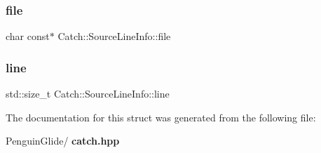 \subsubsection{file}
{\footnotesize\ttfamily char const$\ast$ Catch\+::\+Source\+Line\+Info\+::file}

\mbox{\label{struct_catch_1_1_source_line_info_a841e5d696c7b9cde24e45e61dd979c77}} 
\subsubsection{line}
{\footnotesize\ttfamily std\+::size\+\_\+t Catch\+::\+Source\+Line\+Info\+::line}



The documentation for this struct was generated from the following file\+:\begin{DoxyCompactItemize}
\item 
Penguin\+Glide/\textbf{ catch.\+hpp}\end{DoxyCompactItemize}

